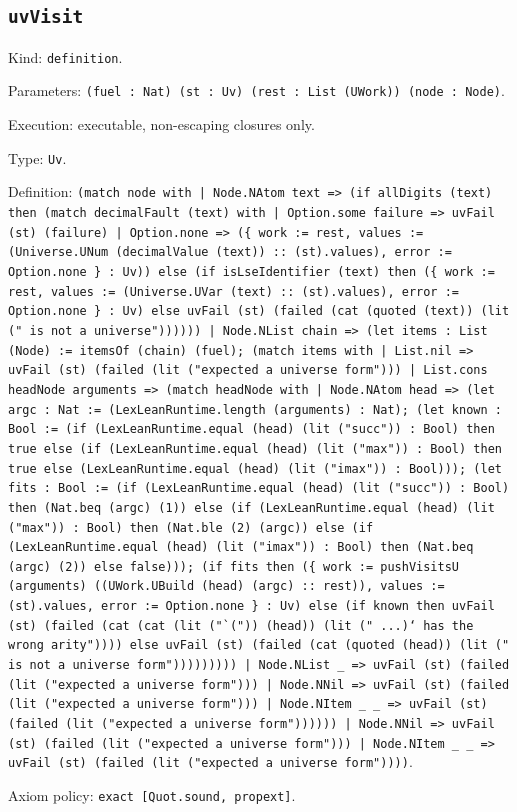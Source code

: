 \documentclass[11pt]{article}
\begin{document}
\subsection*{\texttt{uvVisit}}
\noindent Kind: \texttt{definition}.\par
\noindent Parameters: \texttt{(fuel : Nat) (st : Uv) (rest : List (UWork)) (node : Node)}.\par
\noindent Execution: executable, non-escaping closures only.\par
\noindent Type: \texttt{Uv}.\par
\noindent Definition: \texttt{(match node with | Node.NAtom text => (if allDigits (text) then (match decimalFault (text) with | Option.some failure => uvFail (st) (failure) | Option.none => (\{ work := rest, values := (Universe.UNum (decimalValue (text)) :: (st).values), error := Option.none \} : Uv)) else (if isLseIdentifier (text) then (\{ work := rest, values := (Universe.UVar (text) :: (st).values), error := Option.none \} : Uv) else uvFail (st) (failed (cat (quoted (text)) (lit (" is not a universe")))))) | Node.NList chain => (let items : List (Node) := itemsOf (chain) (fuel); (match items with | List.nil => uvFail (st) (failed (lit ("expected a universe form"))) | List.cons headNode arguments => (match headNode with | Node.NAtom head => (let argc : Nat := (LexLeanRuntime.length (arguments) : Nat); (let known : Bool := (if (LexLeanRuntime.equal (head) (lit ("succ")) : Bool) then true else (if (LexLeanRuntime.equal (head) (lit ("max")) : Bool) then true else (LexLeanRuntime.equal (head) (lit ("imax")) : Bool))); (let fits : Bool := (if (LexLeanRuntime.equal (head) (lit ("succ")) : Bool) then (Nat.beq (argc) (1)) else (if (LexLeanRuntime.equal (head) (lit ("max")) : Bool) then (Nat.ble (2) (argc)) else (if (LexLeanRuntime.equal (head) (lit ("imax")) : Bool) then (Nat.beq (argc) (2)) else false))); (if fits then (\{ work := pushVisitsU (arguments) ((UWork.UBuild (head) (argc) :: rest)), values := (st).values, error := Option.none \} : Uv) else (if known then uvFail (st) (failed (cat (cat (lit ("`(")) (head)) (lit (" ...)` has the wrong arity")))) else uvFail (st) (failed (cat (quoted (head)) (lit (" is not a universe form"))))))))) | Node.NList \_ => uvFail (st) (failed (lit ("expected a universe form"))) | Node.NNil => uvFail (st) (failed (lit ("expected a universe form"))) | Node.NItem \_ \_ => uvFail (st) (failed (lit ("expected a universe form")))))) | Node.NNil => uvFail (st) (failed (lit ("expected a universe form"))) | Node.NItem \_ \_ => uvFail (st) (failed (lit ("expected a universe form"))))}.\par
\noindent Axiom policy: \texttt{exact [Quot.sound, propext]}.\par
\end{document}
